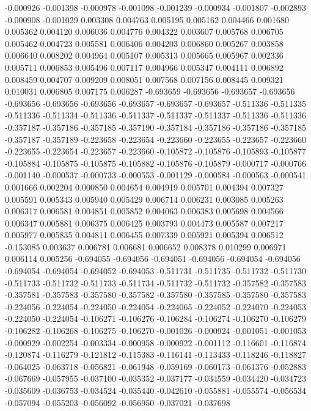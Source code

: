 -0.000926
-0.001398
-0.000978
-0.001098
-0.001239
-0.000934
-0.001807
-0.002893
-0.000908
-0.001029
0.003308
0.004763
0.005195
0.005162
0.004466
0.001680
0.005362
0.004120
0.006036
0.004776
0.004322
0.003607
0.005768
0.006705
0.005462
0.004723
0.005581
0.006406
0.004203
0.006860
0.005267
0.003858
0.006640
0.008202
0.004964
0.005107
0.005313
0.005665
0.005967
0.002336
0.005711
0.006853
0.005496
0.007117
0.004966
0.005347
0.004111
0.006892
0.008459
0.004707
0.009209
0.008051
0.007568
0.007156
0.008445
0.009321
0.010031
0.006805
0.007175
0.006287
-0.693659
-0.693656
-0.693657
-0.693656
-0.693656
-0.693656
-0.693656
-0.693657
-0.693657
-0.693657
-0.511336
-0.511335
-0.511336
-0.511334
-0.511336
-0.511337
-0.511337
-0.511337
-0.511336
-0.511336
-0.357187
-0.357186
-0.357185
-0.357190
-0.357184
-0.357186
-0.357186
-0.357185
-0.357187
-0.357189
-0.223658
-0.223654
-0.223660
-0.223655
-0.223657
-0.223660
-0.223655
-0.223654
-0.223657
-0.223660
-0.105872
-0.105876
-0.105893
-0.105877
-0.105884
-0.105875
-0.105875
-0.105882
-0.105876
-0.105879
-0.000717
-0.000766
-0.001140
-0.000537
-0.000733
-0.000553
-0.001129
-0.000584
-0.000563
-0.000541
0.001666
0.002204
0.000850
0.004654
0.004919
0.005701
0.004394
0.007327
0.005591
0.005343
0.005940
0.005429
0.006714
0.006231
0.003085
0.005263
0.006317
0.006581
0.004851
0.005852
0.004063
0.006383
0.005698
0.004566
0.006347
0.005881
0.006375
0.006425
0.003793
0.004473
0.005587
0.007217
0.005977
0.005835
0.004811
0.006455
0.007339
0.005921
0.005394
0.006512
-0.153085
0.003637
0.006781
0.006681
0.006652
0.008378
0.010299
0.006971
0.006114
0.005256
-0.694055
-0.694056
-0.694051
-0.694056
-0.694054
-0.694056
-0.694054
-0.694054
-0.694052
-0.694053
-0.511731
-0.511735
-0.511732
-0.511730
-0.511733
-0.511732
-0.511733
-0.511734
-0.511732
-0.511732
-0.357582
-0.357583
-0.357581
-0.357583
-0.357580
-0.357582
-0.357580
-0.357585
-0.357580
-0.357583
-0.224056
-0.224054
-0.224050
-0.224054
-0.224065
-0.224052
-0.224070
-0.224053
-0.224050
-0.224054
-0.106271
-0.106276
-0.106284
-0.106274
-0.106270
-0.106279
-0.106282
-0.106268
-0.106275
-0.106270
-0.001026
-0.000924
-0.001051
-0.001053
-0.000929
-0.002254
-0.003334
-0.000958
-0.000922
-0.001112
-0.116601
-0.116874
-0.120874
-0.116279
-0.121812
-0.115383
-0.116141
-0.113433
-0.118246
-0.118827
-0.064025
-0.063718
-0.056821
-0.061948
-0.059169
-0.060173
-0.061376
-0.052883
-0.067669
-0.057955
-0.037100
-0.035352
-0.037177
-0.034559
-0.034420
-0.034723
-0.035609
-0.036753
-0.034524
-0.035440
-0.042610
-0.055881
-0.055574
-0.056534
-0.057094
-0.055203
-0.056092
-0.056950
-0.037021
-0.037698
